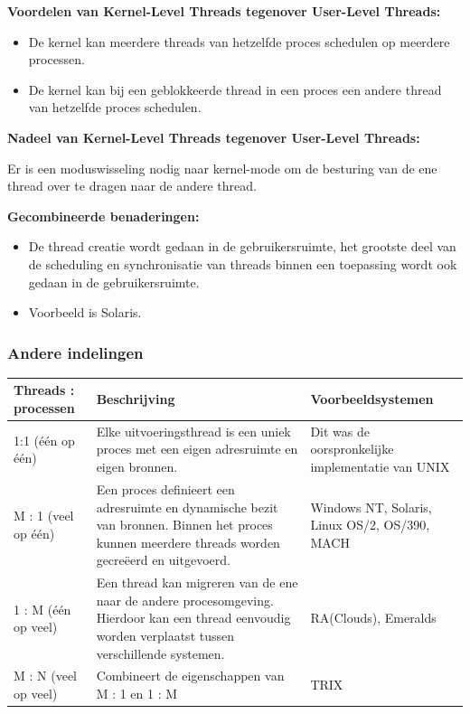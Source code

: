 \textbf{Voordelen van Kernel-Level Threads tegenover User-Level Threads:}

\begin{itemize}
    \item De kernel kan meerdere threads van hetzelfde proces schedulen op meerdere processen.
    \item De kernel kan bij een geblokkeerde thread in een proces een andere thread van hetzelfde proces schedulen.
\end{itemize}

\textbf{Nadeel van Kernel-Level Threads tegenover User-Level Threads:}

Er is een moduswisseling nodig naar kernel-mode om de besturing van de ene thread over te dragen naar de andere thread.

\textbf{Gecombineerde benaderingen:}

\begin{itemize}
\item De thread creatie wordt gedaan in de gebruikersruimte, het grootste deel van de scheduling en synchronisatie van threads binnen een toepassing wordt ook gedaan in de gebruikersruimte.
\item Voorbeeld is Solaris.
\end{itemize}

\subsubsection{Andere indelingen}

    \begin{center}
    \def\arraystretch{1.5}%

    \begin{tabular}{ | p{4cm} | p{6cm} | p{5cm} |}
    \hline
    Threads : processen & Beschrijving & Voorbeeldsystemen \\ \hline
    1:1 (één op één)     & Elke uitvoeringsthread is een uniek proces met een eigen adresruimte en eigen bronnen. & Dit was de oorspronkelijke implementatie van UNIX \\ \hline
   M : 1 (veel op één)   & Een proces definieert een adresruimte en dynamische bezit van bronnen. Binnen het proces kunnen meerdere threads worden gecreëerd en uitgevoerd. & Windows NT, Solaris, Linux OS/2, OS/390, MACH \\ \hline
1 : M (één op veel)      & Een thread kan migreren van de ene naar de andere procesomgeving. Hierdoor kan een thread eenvoudig worden verplaatst tussen verschillende systemen. & RA(Clouds), Emeralds \\ \hline
   M : N (veel op veel)  & Combineert de eigenschappen van M : 1 en 1 : M & TRIX \\ \hline
    \end{tabular}
\end{center}

